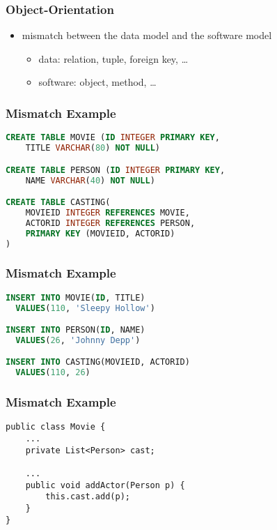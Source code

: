 \documentclass[dvipsnames]{beamer}
\theoremstyle{plain}
\begin{document}
\begin{frame}
  \frametitle{Object-Orientation}

  \begin{itemize}
    \item mismatch between the data model and the software model
    \begin{itemize}
      \item data: relation, tuple, foreign key, \ldots
      \item software: object, method, \ldots
    \end{itemize}
  \end{itemize}
\end{frame}

\begin{frame}[fragile]
  \frametitle{Mismatch Example}

  \begin{example}
    \begin{lstlisting}[language=SQL]
CREATE TABLE MOVIE (ID INTEGER PRIMARY KEY,
    TITLE VARCHAR(80) NOT NULL)

CREATE TABLE PERSON (ID INTEGER PRIMARY KEY,
    NAME VARCHAR(40) NOT NULL)

CREATE TABLE CASTING(
    MOVIEID INTEGER REFERENCES MOVIE,
    ACTORID INTEGER REFERENCES PERSON,
    PRIMARY KEY (MOVIEID, ACTORID)
)
    \end{lstlisting}
  \end{example}
\end{frame}

\begin{frame}[fragile]
  \frametitle{Mismatch Example}

  \begin{example}
    \begin{lstlisting}[language=SQL]
INSERT INTO MOVIE(ID, TITLE)
  VALUES(110, 'Sleepy Hollow')

INSERT INTO PERSON(ID, NAME)
  VALUES(26, 'Johnny Depp')

INSERT INTO CASTING(MOVIEID, ACTORID)
  VALUES(110, 26)
    \end{lstlisting}
  \end{example}
\end{frame}

\begin{frame}[fragile]
  \frametitle{Mismatch Example}

  \begin{example}
    \begin{lstlisting}
public class Movie {
    ...
    private List<Person> cast;

    ...
    public void addActor(Person p) {
        this.cast.add(p);
    }
}
    \end{lstlisting}
  \end{example}
\end{frame}
\end{document}
